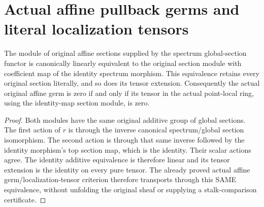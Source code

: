 \section{Actual affine pullback germs and literal localization tensors}

\begin{lemma}
\label{lem:affine-identity-sections-module}
\leanok
{}
The module of original affine sections supplied by the spectrum global-section
functor is canonically linearly equivalent to the original section module
with coefficient map of the identity spectrum morphism. This equivalence
retains every original section literally, and so does its tensor extension. Consequently the actual original affine
germ is zero if and only if its tensor in the actual point-local ring,
using the identity-map section module, is zero.
\end{lemma}
\begin{proof}
Both modules have the same original additive group of global sections.
The first action of $r$ is through the inverse canonical spectrum/global
section isomorphism. The second action is through that same inverse
followed by the identity morphism's top section map, which is the identity.
Their scalar actions agree. The identity additive equivalence is therefore
linear and its tensor extension is the identity on every pure tensor.
The already proved actual affine germ/localization-tensor criterion
therefore transports through this SAME equivalence, without unfolding
the original sheaf or supplying a stalk-comparison certificate.
\end{proof}

